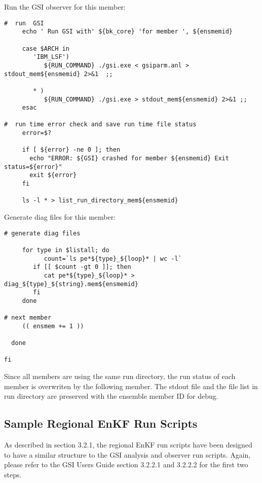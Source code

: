 Run the GSI observer for this member:
\begin{scriptsize}
\begin{verbatim}
#  run  GSI
     echo ' Run GSI with' ${bk_core} 'for member ', ${ensmemid}

     case $ARCH in
        'IBM_LSF')
           ${RUN_COMMAND} ./gsi.exe < gsiparm.anl > stdout_mem${ensmemid} 2>&1  ;;

        * )
           ${RUN_COMMAND} ./gsi.exe > stdout_mem${ensmemid} 2>&1 ;;
     esac

#  run time error check and save run time file status
     error=$?

     if [ ${error} -ne 0 ]; then
       echo "ERROR: ${GSI} crashed for member ${ensmemid} Exit status=${error}"
       exit ${error}
     fi

     ls -l * > list_run_directory_mem${ensmemid}
\end{verbatim}
\end{scriptsize}

Generate diag files for this member:
\begin{scriptsize}
\begin{verbatim}
# generate diag files

     for type in $listall; do
           count=`ls pe*${type}_${loop}* | wc -l`
        if [[ $count -gt 0 ]]; then
           cat pe*${type}_${loop}* > diag_${type}_${string}.mem${ensmemid}
        fi
     done

# next member
     (( ensmem += 1 ))

  done

fi
\end{verbatim}
\end{scriptsize}

Since all members are using the same run directory, the run status of each member is overwriten by the following member. The stdout file and the file list in run directory are preserved with the ensemble member ID for debug.

\subsection{Sample Regional EnKF Run Scripts}

As described in section 3.2.1, the regional EnKF run scripts have been designed to have a similar structure to the GSI analysis and observer run scripts. Again, please refer to the GSI User\textquotesingle s Guide section 3.2.2.1 and 3.2.2.2 for the first two steps.

